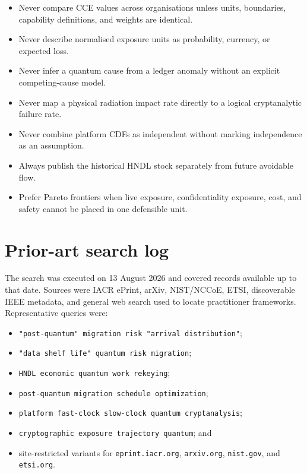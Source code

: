 \documentclass[10pt]{article}
\begin{document}
\begin{itemize}
\item Never compare CCE values across organisations unless units, boundaries, capability definitions, and weights are identical.
\item Never describe normalised exposure units as probability, currency, or expected loss.
\item Never infer a quantum cause from a ledger anomaly without an explicit competing-cause model.
\item Never map a physical radiation impact rate directly to a logical cryptanalytic failure rate.
\item Never combine platform CDFs as independent without marking independence as an assumption.
\item Always publish the historical HNDL stock separately from future avoidable flow.
\item Prefer Pareto frontiers when live exposure, confidentiality exposure, cost, and safety cannot be placed in one defensible unit.
\end{itemize}

\section{Prior-art search log}

The search was executed on 13 August 2026 and covered records available up to that date. Sources were IACR ePrint, arXiv, NIST/NCCoE, ETSI, discoverable IEEE metadata, and general web search used to locate practitioner frameworks. Representative queries were:

\begin{itemize}
\item \texttt{"post-quantum" migration risk "arrival distribution"};
\item \texttt{"data shelf life" quantum risk migration};
\item \texttt{HNDL economic quantum work rekeying};
\item \texttt{post-quantum migration schedule optimization};
\item \texttt{platform fast-clock slow-clock quantum cryptanalysis};
\item \texttt{cryptographic exposure trajectory quantum}; and
\item site-restricted variants for \texttt{eprint.iacr.org}, \texttt{arxiv.org}, \texttt{nist.gov}, and \texttt{etsi.org}.
\end{itemize}
\end{document}
